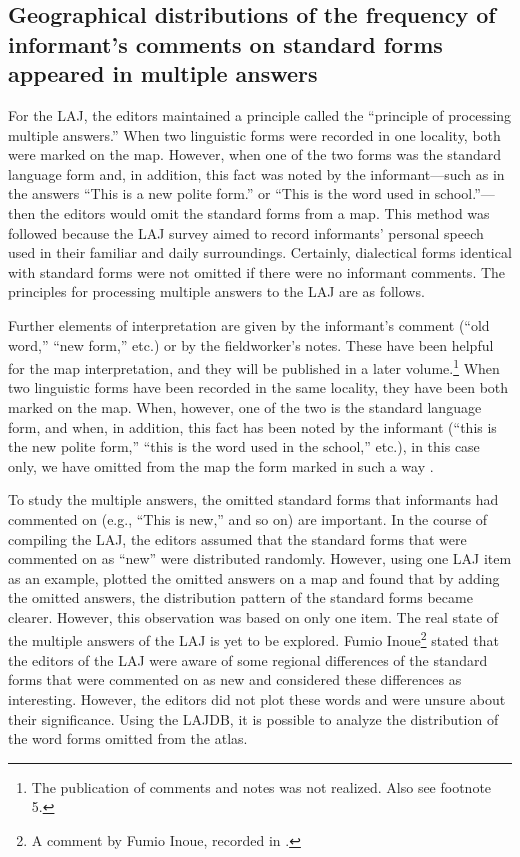 \documentclass[output=paper]{LSP/langsci}
\begin{document}
\subsection{Geographical distributions of the frequency of informant’s comments on standard forms appeared in multiple
answers}
For the LAJ, the editors maintained a principle called the “principle of processing multiple answers.” When two linguistic forms were recorded in one locality, both were marked on the map. However, when one of the two forms was the standard language form and, in addition, this fact was noted by the informant—such as in the answers “This is a new polite form.” or “This is the word used in school.”—then the editors would omit the standard forms from a map. This method was followed because the LAJ survey aimed to record informants’ personal speech used in their familiar and daily surroundings. Certainly, dialectical forms identical with standard forms were not omitted if there were no informant comments. The principles for processing multiple answers to the LAJ are as follows.

Further elements of interpretation are given by the informant’s comment (“old word,” “new form,” etc.) or by the fieldworker’s notes. These have been helpful for the map interpretation, and they will be published in a later volume.\footnote{The publication of comments and notes was not realized. Also see footnote 5.} When two linguistic forms have been recorded in the same locality, they have been both marked on the map. When, however, one of the two is the standard language form, and when, in addition, this fact has been noted by the informant (“this is the new polite form,” “this is the word used in the school,” etc.), in this case only, we have omitted from the map the form marked in such a way \citep[44]{kokuritsu_kokugo_kenkyujo_nlri_nihon_1966}.

To study the multiple answers, the omitted standard forms that informants had commented on (e.g., “This is new,” and so on) are important. In the course of compiling the LAJ, the editors assumed that the standard forms that were commented on as “new” were distributed randomly. However, using one LAJ item as an example, \citet[152--153]{sato_chiikishakai_1986} plotted the omitted answers on a map and found that by adding the omitted answers, the distribution pattern of the standard forms became clearer. However, this observation was based on only one item. The real state of the multiple answers of the LAJ is yet to be explored. Fumio Inoue\footnote{A comment by Fumio Inoue, recorded in \citet[5]{inagaki_hogen_1980}.} stated that the editors of the LAJ were aware of some regional differences of the standard forms that were commented on as new and considered these differences as interesting. However, the editors did not plot these words and were unsure about their significance. Using the LAJDB, it is possible to analyze the distribution of the word forms omitted from the atlas.
\end{document}
